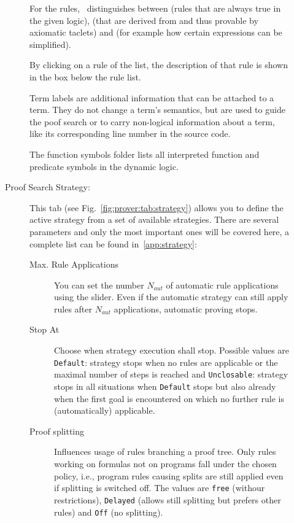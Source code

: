 \begin{description}
\begin{description}
    For the rules, \KeY\ distinguishes
    between  (rules that are always true in the
    given logic),  (that are derived from and thus provable
    by axiomatic taclets) and  (for example how
    certain expressions can be simplified).
    
    By clicking on a rule of the list, the description of that rule is
    shown in the box below the rule list.
    
    Term labels are additional information that can be attached to a term.
    They do not change a term's semantics, but are used to guide the poof
    search or to carry non-logical information about a term, like its
    corresponding line number in the source code.
    
    The function symbols folder lists all interpreted function and predicate
    symbols in the dynamic logic.
    
  \item[Proof Search Strategy:] This tab (see
    Fig.~\ref{fig:prover:tab:strategy}) allows you to define the active
    strategy from a set of available strategies. There are several
    parameters and only the most important ones will be covered here, 
    a complete list can be found in~\ref{app:strategy}:

    \begin{description}

    \item[Max. Rule Applications] You can set the number $N_{aut}$ of
      automatic rule applications using the slider. Even if the
      automatic strategy can still apply rules after $N_{aut}$
      applications, automatic proving stops. 


    \item[Stop At] Choose when strategy execution shall stop.
      Possible values are \texttt{Default}: strategy stops when no
      rules are applicable or the maximal number of steps is reached and
      \texttt{Unclosable}: strategy stops in all situations when
      \texttt{Default} stops but also already when the first goal is
      encountered on which no further rule is (automatically) applicable. 

    \item[Proof splitting] Influences usage of rules branching a
      proof tree. Only rules working on formulas not on
      programs fall under the chosen policy, i.e., program rules
      causing
      splits are still applied even if splitting is switched off. The
      values are \texttt{free} (withour restrictions), \texttt{Delayed}
      (allows still splitting but prefers other rules) and \texttt{Off} (no
      splitting).


\end{description}
\end{description}
\end{description}
